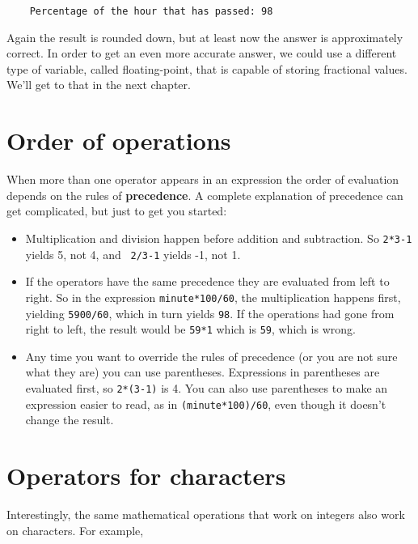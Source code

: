 \begin{verbatim}
    Percentage of the hour that has passed: 98
\end{verbatim}
%
Again the result is rounded down, but at least now the answer
is approximately correct.  In order to get an even more accurate
answer, we could use a different type of variable, called
floating-point, that is capable of storing fractional values.
We'll get to that in the next chapter.

\section{Order of operations}

When more than one operator appears in an expression the order
of evaluation depends on the rules of {\bf precedence}.  A
complete explanation of precedence can get complicated, but
just to get you started:

\begin{itemize}

\item Multiplication and division happen before
addition and subtraction.  So {\tt 2*3-1} yields 5, not 4, and {\tt
2/3-1} yields -1, not 1.

\item If the operators have the same precedence they are evaluated
from left to right.  So in the expression {\tt minute*100/60},
the multiplication happens first, yielding {\tt 5900/60}, which
in turn yields {\tt 98}.  If the operations had gone from right
to left, the result would be {\tt 59*1} which is {\tt 59}, which
is wrong.

\item Any time you want to override the rules of precedence (or
you are not sure what they are) you can use parentheses.  Expressions
in parentheses are evaluated first, so {\tt 2*(3-1)} is 4.
You can also use parentheses to make an expression easier to
read, as in {\tt (minute*100)/60}, even though it doesn't
change the result.

\end{itemize}

\section{Operators for characters}

Interestingly, the same mathematical operations that work on
integers also work on characters.  For example,

